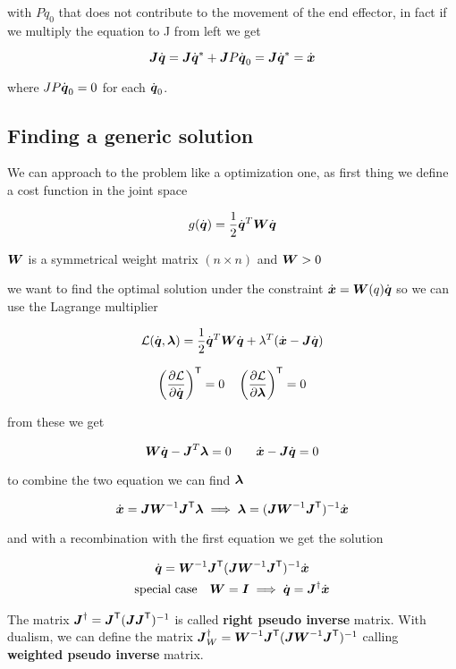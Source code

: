 with $P \dot{q}_0$ that does not contribute to the movement of the end effector, in fact if we multiply the equation to J from left we get

\[ \J\dq = \J\dq^* + \J P \dq_0 = \J \dq^* = \dx \]

where $J P \dq_0 = 0$ for each $\dq_0$.

\subsection{Finding a generic solution}

We can approach to the problem like a optimization one, as first thing we define a cost function in the joint space

\[ g(\dq) = \frac{1}{2} \dq^T \matr{W} \dq \]

$\matr{W}$ is a symmetrical weight matrix $(n \times n)$ and $\matr{W} > 0$

we want to find the optimal solution under the constraint $\dx = \matr{W}(q) \dq$ so we can use the Lagrange multiplier

\[ \mathcal{L}(\dq, \vect\lambda) = \frac{1}{2} \dq^T \matr{W} \dq + \lambda^T (\dx - \J \dq)\]

\[
	\left(\frac{\partial \mathcal{L}}{\partial \dq}\right)^\trans = 0 \quad
	\left(\frac{\partial \mathcal{L}}{\partial \vect{\lambda}}\right)^\trans = 0
\]

from these we get

\[ \matr{W}\dq - \J^T\vect{\lambda} = 0 \qquad \dx - \J\dq = 0 \]

to combine the two equation we can find $\vect{\lambda}$

\[
\dx = \J\matr{W}^{-1}\J^\trans \vect{\lambda} \implies
\vect{\lambda} = (\J\matr{W}^{-1}\J^\trans)^{-1} \dx
\]

and with a recombination with the first equation we get the solution

\begin{gather*}
	\dq = \matr{W}^{-1} \J^\trans (\J\matr{W}^{-1}\J^\trans)^{-1} \dx \\
	\text{special case} \quad \matr{W} = \I \implies \dq = \J^\psinv \dx
\end{gather*}

The matrix $\J^\psinv = \J^\trans (\J\J^\trans)^{-1}$ is called \textbf{right pseudo inverse} matrix.
With dualism, we can define the matrix $\J^\psinv_W = \matr{W}^\inv \J^\trans (\J\matr{W}^\inv\J^\trans)^\inv$ calling \textbf{weighted pseudo inverse} matrix.

